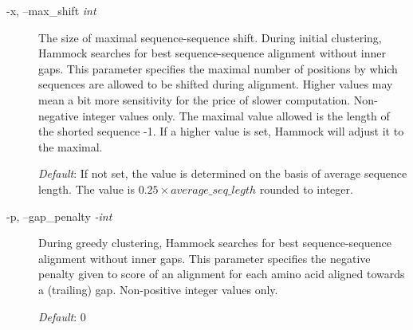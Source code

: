 \documentclass[11pt, a4paper, twoside, titlepage]{article}
\begin{document}
\begin{description}
\item[-x, --max\_shift \rm \textlangle \textit{int}\textrangle] The size of maximal sequence-sequence shift. During initial clustering, Hammock searches for best sequence-sequence alignment without inner gaps. This parameter specifies the maximal number of positions by which sequences are allowed to be shifted during alignment. Higher values may mean a bit more sensitivity for the price of slower computation. Non-negative integer values only. The maximal value allowed is the length of the shorted sequence -1. If a higher value is set, Hammock will adjust it to the maximal.

\textit{Default}: If not set, the value is determined on the basis of average sequence length. The value is $0.25 \times average\_seq\_legth$ rounded to integer.

\item[-p, --gap\_penalty \rm \textlangle \textit{-int}\textrangle] During greedy clustering, Hammock searches for best sequence-sequence alignment without inner gaps. This parameter specifies the negative penalty given to score of an alignment for each amino acid aligned towards a (trailing) gap. Non-positive integer values only.

\textit{Default}: 0

\end{description}
\end{document}
